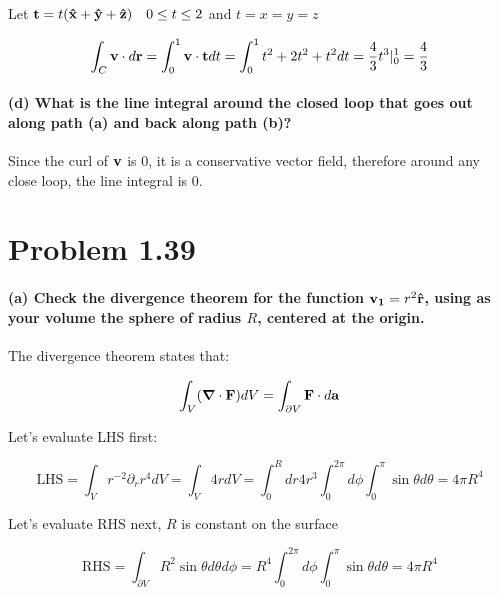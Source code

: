 \documentclass{article}
\numberwithin{equation}{section}
\newcommand{\vbh}[1]{\vb{\hat{#1}}}
\begin{document}
Let $\vb{t} = t (\vbh{x}+\vbh{y}+\vbh{z}) \quad 0 \leq t \leq 2$ and $t = x = y = z$

\begin{equation}
    \int_{C} \vb{v} \cdot d \vb{r} = \int_{0}^{1} \vb{v \cdot \vb{t}} dt = \int_0^1 t^2 + 2t^2 + t^2 dt = \frac{4}{3} t^3 \rvert^1_0 = \frac{4}{3}
\end{equation}

\paragraph{(d) What is the line integral around the closed loop that goes out along path (a) and back along path (b)? \\}

Since the curl of $\vb{v}$ is 0, it is a conservative vector field, therefore around any close loop, the line integral is 0.

\section{Problem 1.39}

\paragraph{(a) Check the divergence theorem for the function $\vb{v_1} = r^2 \vbh{r}$, using as your volume the sphere of radius $R$, centered at the origin.\\}

The divergence theorem states that:

\begin{equation}
    \int_{V} (\grad \cdot \vb{F}) dV = \int_{\partial V} \vb{F} \cdot d \vb{a}
\end{equation}

Let's evaluate LHS first:

\begin{equation}
    \text{LHS} = \int_V r^{-2} \partial_r r^4 dV = \int_V 4 r dV = \int^R_0 dr 4r^3 \int_0^{2\pi} d \phi \int^\pi_0 \sin \theta d \theta = 4 \pi R^4
\end{equation}

Let's evaluate RHS next, $R$ is constant on the surface

\begin{equation}
    \text{RHS} = \int_{\partial V} R^2 \sin \theta d\theta d\phi = R^4 \int_{0}^{2\pi} d \phi \int_{0}^\pi \sin \theta d \theta = 4 \pi R^4
\end{equation}
\end{document}
